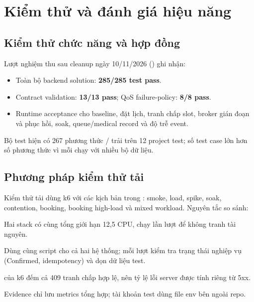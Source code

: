 \section{Kiểm thử và đánh giá hiệu năng}
\label{ch:testing}

\subsection{Kiểm thử chức năng và hợp đồng}

Lượt nghiệm thu sau cleanup ngày 10/11/2026 () ghi nhận:

\begin{itemize}
  \item Toàn bộ backend solution: \textbf{285/285 test pass}.
  \item Contract validation: \textbf{13/13 pass}; QoS failure-policy: \textbf{8/8 pass}.
  \item Runtime acceptance cho baseline, đặt lịch, tranh chấp slot, broker gián đoạn và phục hồi, soak, queue/medical record và độ trễ event.
\end{itemize}

Bộ test hiện có 267 phương thức \code{[Fact]}/\code{[Theory]} trải trên 12 project test; số test case lớn hơn số phương thức vì mỗi \code{[Theory]} chạy với nhiều bộ dữ liệu.

\subsection{Phương pháp kiểm thử tải}

Kiểm thử tải dùng k6 với các kịch bản trong : smoke, load, spike, soak, contention, booking, booking high-load và mixed workload. Nguyên tắc so sánh:

\begin{codeitems}
  \item Hai stack có cùng tổng giới hạn 12,5 CPU, chạy lần lượt để không tranh tài nguyên.
  \item Dùng cùng script cho cả hai hệ thống; mỗi lượt kiểm tra trạng thái nghiệp vụ (Confirmed, idempotency) và dọn dữ liệu test.
  \item {} của k6 đếm cả 409 tranh chấp hợp lệ, nên tỷ lệ lỗi server được tính riêng từ 5xx.
  \item Evidence chỉ lưu metrics tổng hợp; tài khoản test dùng file env bên ngoài repo.
\end{codeitems}

